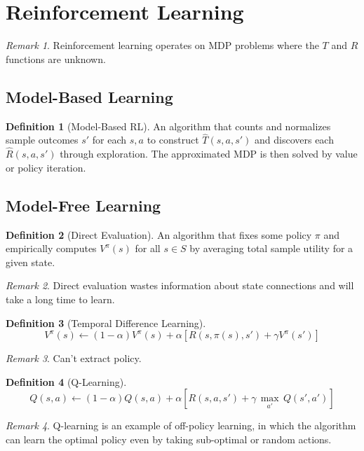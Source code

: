 \documentclass[11pt]{article}
\theoremstyle{definition}
\newtheorem{definition}{Definition}[section]
\theoremstyle{remark}
\newtheorem*{remark}{Remark}
\begin{document}
\section{Reinforcement Learning}
\begin{remark}
Reinforcement learning operates on MDP problems where the $T$ and $R$ functions are unknown.
\end{remark}

\subsection{Model-Based Learning}
\begin{definition}[Model-Based RL]
An algorithm that counts and normalizes sample outcomes $s'$ for each $s,a$ to construct $\hat{T}(s,a,s')$ and discovers each $\hat{R}(s,a,s')$ through exploration. The approximated MDP is then solved by value or policy iteration.
\end{definition}

\subsection{Model-Free Learning}
\begin{definition}[Direct Evaluation]
An algorithm that fixes some policy $\pi$ and empirically computes $V^\pi(s)$ for all $s \in S$ by averaging total sample utility for a given state.
\end{definition}
\begin{remark}
Direct evaluation wastes information about state connections and will take a long time to learn.
\end{remark}

\begin{definition}[Temporal Difference Learning]
$$V^\pi(s) \gets (1-\alpha)V^\pi(s) + \alpha [R(s,\pi(s),s')+\gamma V^\pi(s')]$$
\end{definition}

\begin{remark}
Can't extract policy.
\end{remark}

\begin{definition}[Q-Learning]
$$Q(s,a) \gets (1-\alpha)Q(s,a) + \alpha [R(s,a,s')+\gamma \, \underset{a'}{\max}\,Q(s',a')]$$
\end{definition}
\begin{remark}
Q-learning is an example of off-policy learning, in which the algorithm can learn the optimal policy even by taking sub-optimal or random actions.
\end{remark}
\end{document}
